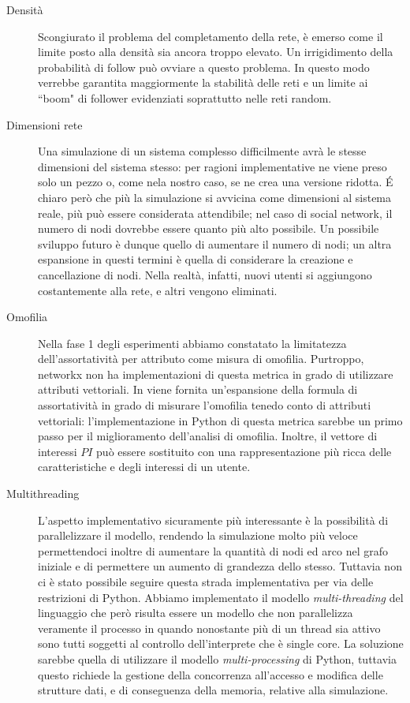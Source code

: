 \documentclass[a4paper,12pt]{article}
\begin{document}
\begin{description}
\item[Densità] Scongiurato il problema del completamento della rete, è emerso come il limite posto alla densità sia ancora troppo elevato. Un irrigidimento della probabilità di follow può ovviare a questo problema. In questo modo verrebbe garantita maggiormente la stabilità delle reti e un limite ai ``boom" di follower evidenziati soprattutto nelle reti random. 
\item[Dimensioni rete] Una simulazione di un sistema complesso difficilmente avrà le stesse dimensioni del sistema stesso: per ragioni implementative ne viene preso solo un pezzo o, come nela nostro caso, se ne crea una versione ridotta. \'E chiaro però che più la simulazione si avvicina come dimensioni al sistema reale, più può essere considerata attendibile; nel caso di social network, il numero di nodi dovrebbe essere quanto più alto possibile. Un possibile sviluppo futuro è dunque quello di aumentare il numero di nodi; un altra espansione in questi termini è quella di considerare la creazione e cancellazione di nodi. Nella realtà, infatti, nuovi utenti si aggiungono costantemente alla rete, e altri vengono eliminati. 
\item[Omofilia] Nella fase 1 degli esperimenti abbiamo constatato la limitatezza dell'assortatività per attributo come misura di omofilia. Purtroppo, networkx non ha implementazioni di questa metrica in grado di utilizzare attributi vettoriali. In \cite{mixing} viene fornita un'espansione della formula di assortatività in grado di misurare l'omofilia tenedo conto di attributi vettoriali: l'implementazione in Python di questa metrica sarebbe un primo passo per il miglioramento dell'analisi di omofilia. Inoltre, il vettore di interessi $PI$ può essere sostituito con una rappresentazione più ricca delle caratteristiche e degli interessi di un utente.
\item[Multithreading] L'aspetto implementativo sicuramente pi\`u interessante \`e la possibilit\`a di parallelizzare il modello, rendendo la simulazione molto pi\`u veloce permettendoci inoltre di aumentare la quantit\`a di nodi ed arco nel grafo iniziale e di permettere un aumento di grandezza dello stesso. Tuttavia non ci \`e stato possibile seguire questa strada implementativa per via delle restrizioni di Python. Abbiamo implementato il modello \textit{multi-threading} del linguaggio che per\`o risulta essere un modello che non parallelizza veramente il processo in quando nonostante pi\`u di un thread sia attivo sono tutti soggetti al controllo dell'interprete che \`e single core. La soluzione sarebbe quella di utilizzare il modello \textit{multi-processing} di Python, tuttavia questo richiede la gestione della concorrenza all'accesso e modifica delle strutture dati, e di conseguenza della memoria, relative alla simulazione. 

\end{description}
\end{document}
